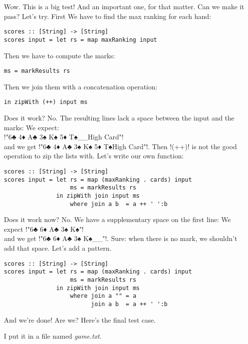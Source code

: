 \lhA Wow. This is a big test!
\lhN And an important one, for that matter. Can we make it pass?
\lhA Let's try. First We have to find the max ranking for each hand:
\begin{lstlisting}[frame=single]
scores :: [String] -> [String]
scores input = let rs = map maxRanking input
\end{lstlisting}
Then we have to compute the marks:
\begin{lstlisting}[frame=single]
                   ms = markResults rs
\end{lstlisting}
Then we join them with a concatenation operation:
\begin{lstlisting}[frame=single]
               in zipWith (++) input ms
\end{lstlisting}
\failure Does it work?
\lhN No. The resulting lines lack a space between the input and the marks:
We expect:\\ \il!"6♣ 4♦ A♣ 3♠ K♠ 5♦ T♠__High Card"! \\ 
and we get \il!"6♣ 4♦ A♣ 3♠ K♠ 5♦ T♠High Card"!.
\lhA \failure Then \il!(++)! is not the good operation to zip the lists with. Let's write our own function:
\begin{lstlisting}[frame=single]
scores :: [String] -> [String]
scores input = let rs = map (maxRanking . cards) input
                   ms = markResults rs
               in zipWith join input ms
                   where join a b  = a ++ ' ':b
\end{lstlisting}
\failure Does it work now?
\lhN No. We have a supplementary space on the first line:
We expect \il!"6♣ 6♦ A♣ 3♠ K♠"! \\ and we get \il!"6♣ 6♦ A♣ 3♠ K♠__"!.
\lhA \failure Sure: when there is no mark, we shouldn't add that space. Let's add a pattern.
\begin{lstlisting}[frame=single]
scores :: [String] -> [String]
scores input = let rs = map (maxRanking . cards) input
                   ms = markResults rs
               in zipWith join input ms
                   where join a "" = a
                         join a b  = a ++ ' ':b
\end{lstlisting}
\success And we're done!
\lhN Are we? Here's the final test case. 
\begin{alltt}
      
      
     
 
      
    
\end{alltt}
I put it in a file named \emph{game.txt}.
 
